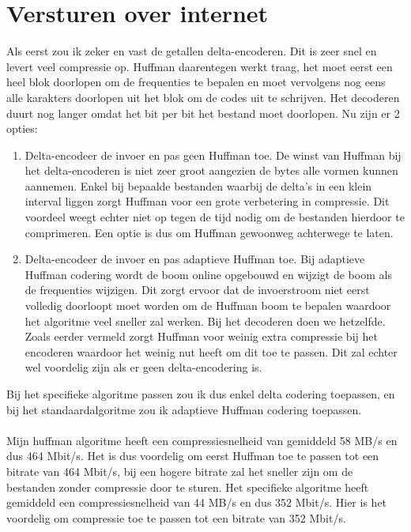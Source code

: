 \documentclass[11pt, a4paper]{article}
\begin{document}
\section{Versturen over internet}
Als eerst zou ik zeker en vast de getallen delta-encoderen. Dit is zeer snel en levert veel compressie op. Huffman daarentegen werkt traag, het moet eerst een heel blok doorlopen om de frequenties te bepalen en moet vervolgens nog eens alle karakters doorlopen uit het blok om de codes uit te schrijven. Het decoderen duurt nog langer omdat het bit per bit het bestand moet doorlopen. 
Nu zijn er 2 opties: 
\begin{enumerate}
	\item Delta-encodeer de invoer en pas geen Huffman toe. De winst van Huffman bij het delta-encoderen is niet zeer groot aangezien de bytes alle vormen kunnen aannemen. Enkel bij bepaalde bestanden waarbij de delta's in een klein interval liggen zorgt Huffman voor een grote verbetering in compressie. Dit voordeel weegt echter niet op tegen de tijd nodig om de bestanden hierdoor te comprimeren. Een optie is dus om Huffman gewoonweg achterwege te laten.
	\item Delta-encodeer de invoer en pas adaptieve Huffman toe. Bij adaptieve Huffman codering wordt de boom online opgebouwd en wijzigt de boom als de frequenties wijzigen. Dit zorgt ervoor dat de invoerstroom niet eerst volledig doorloopt moet worden om de Huffman boom te bepalen waardoor het algoritme veel sneller zal werken. Bij het decoderen doen we hetzelfde. 
	Zoals eerder vermeld zorgt Huffman voor weinig extra compressie bij het encoderen waardoor het weinig nut heeft om dit toe te passen. Dit zal echter wel voordelig zijn als er geen delta-encodering is. 
\end{enumerate}
Bij het specifieke algoritme passen zou ik dus enkel delta codering toepassen, en bij het standaardalgoritme zou ik adaptieve Huffman codering toepassen.
\\\\
Mijn huffman algoritme heeft een compressiesnelheid van gemiddeld 58 MB/s en dus 464 Mbit/s. Het is dus voordelig om eerst Huffman toe te passen tot een bitrate van 464 Mbit/s, bij een hogere bitrate zal het sneller zijn om de bestanden zonder compressie door te sturen. Het specifieke algoritme heeft gemiddeld een compressiesnelheid van 44 MB/s en dus 352 Mbit/s. Hier is het voordelig om compressie toe te passen tot een bitrate van 352 Mbit/s. 
\end{document}

